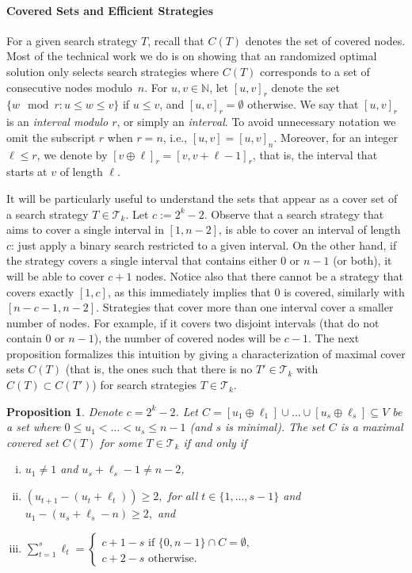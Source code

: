 \documentclass[11pt]{article}
\newtheorem{proposition}{Proposition}[section]
\newcommand{\BSTs}{\mathcal{T}}
\newcommand\+{\mkern2mu}
\newcommand{\T}{T}
\begin{document}
\paragraph*{Covered Sets and Efficient Strategies}
For a given search strategy $\T$, recall that $C(T)$ denotes the set of covered nodes. Most of the technical work we do is on showing that an randomized optimal solution only selects search strategies where $C(T)$ corresponds to a set of consecutive nodes modulo~$n$. For $u,v\in \mathbb{N}$, let $[u,v]_r$ denote the set $\{w \mod r: u\le w\le v\}$ if $u\le v$, and $[u,v]_r=\emptyset$ otherwise. We say that $[u,v]_r$ is an \textit{interval modulo $r$}, or simply an \textit{interval}. To avoid unnecessary notation we omit the subscript $r$ when $r=n$, i.e., $[u,v]=[u,v]_n$. Moreover, for an integer $\ell \le r$, we denote by $[v\oplus \ell]_r = [v,v+\ell-1]_r$, that is, the interval that starts at $v$ of length $\ell$.

It will be particularly useful to understand the sets that appear as a cover set of a search strategy $\T\in \mathcal{T}_k$.
Let $c:=2^k-2$. Observe that a search strategy that aims to cover a single interval in $[1,n-2]$, is able to cover an interval of length $c$: just apply a binary search restricted to a given interval. On the other hand, if the strategy covers a single interval that contains either $0$ or $n-1$ (or both), it will be able to cover $c+1$ nodes. Notice also that there cannot be a strategy that covers exactly $[1,c]$, as this immediately implies that $0$ is covered, similarly with $[n-c-1,n-2]$.  Strategies that cover more than one interval cover a smaller number of nodes. For example, if it covers two disjoint intervals (that do not contain $0$ or $n-1$), the number of covered nodes will be $c-1$. The next proposition formalizes this intuition by giving a characterization of maximal cover sets $C(T)$ (that is, the ones such that there is no $T'\in\mathcal{T}_k$ with $C(T)\subset C(T')$) for search strategies $T\in \mathcal{T}_k$.



\begin{proposition}\label{prop:non-dominated} Denote $c=2^k-2$. Let $C= [u_1 \oplus \ell_1] \cup \ldots \cup [u_s \oplus \ell_s] \subseteq V$ be a set
where $0\le u_1< \ldots < u_s\le n-1$ (and $s$ is minimal).
The set $C$ is a maximal covered set $C(T)$ for some $T \in \BSTs_k$ if and only if
\begin{enumerate}[i)]
    \item $u_1\neq 1$ and $u_s+\ell_s-1\neq n-2$,
    \item $(u_{t+1} - (u_t +\ell_t)) \geq 2,$ for all $t\in \{1,\ldots,s-1\}$ and $u_1- (u_s + \ell_s - n)\ge 2,$ and
    \item $\sum_{t=1}^s \ell_t = \begin{cases}c+1 - s \text{ if } \{0,n-1\}\cap C =\emptyset,\\ c+2 - s \text { otherwise.}\end{cases}$
\end{enumerate}
\end{proposition}
\end{document}
